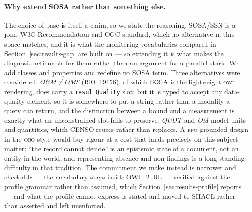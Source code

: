 \paragraph{Why extend SOSA rather than something else.}
The choice of base is itself a claim, so we state the reasoning. SOSA/SSN is a
joint W3C Recommendation and OGC standard, which no alternative in this space
matches, and it is what the monitoring vocabularies compared in
Section~\ref{sec:results-gap} are built on --- so extending it is what makes the
diagnosis actionable for them rather than an argument for a parallel stack. We
add classes and properties and redefine no SOSA term. Three alternatives were
considered. \emph{O\&M / OMS} (ISO~19156), of which SOSA is the lightweight
\textsc{owl} rendering, does carry a \texttt{resultQuality} slot; but it is
typed to accept any data-quality element, so it is somewhere to put a string
rather than a modality a query can return, and the distinction between a bound
and a measurement is exactly what an unconstrained slot fails to preserve.
\emph{QUDT} and \emph{OM} model units and quantities, which CENSO reuses rather
than replaces. A \textsc{bfo}-grounded design in the \textsc{obo} style would
buy rigour at a cost that lands precisely on this subject matter: ``the record
cannot decide'' is an epistemic state of a document, not an entity in the world,
and representing absence and non-findings is a long-standing difficulty in that
tradition. The commitment we make instead is narrower and checkable --- the
vocabulary stays inside OWL~2~RL --- verified against the profile grammar
rather than assumed, which Section~\ref{sec:results-profile} reports --- and
what the profile cannot express is stated
and moved to SHACL rather than asserted and left unenforced.

